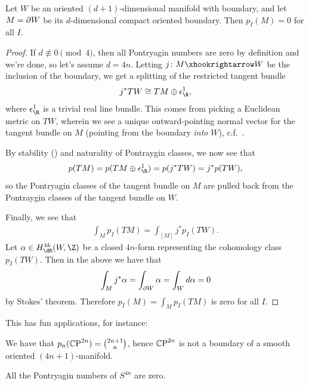 \documentclass[11pt]{book}
\begin{document}
\begin{lemma}\label{lem:pontryagin-numbers-of-boundary-are-zero} 
Let $W$ be an oriented $(d+1)$-dimensional manifold with boundary, and let $M = \partial W$ be its $d$-dimensional compact oriented boundary. Then $p_I(M) = 0$ for all $I$.
\end{lemma}
\begin{proof} If $d \not\equiv 0\pmod{4}$, then all Pontryagin numbers are zero by definition and we're done, so let's assume $d = 4n$. Letting $j \colon M \hookto W$ be the inclusion of the boundary, we get a splitting of the restricted tangent bundle
\begin{align*}
    j^\ast TW \cong TM \oplus \epsilon_\R^1,
\end{align*}
where $\epsilon_\R^1$ is a trivial real line bundle. This comes from picking a Euclidean metric on $TW$, wherein we see a unique outward-pointing normal vector for the tangent bundle on $M$ (pointing from the boundary \emph{into} $W$), c.f.~\cite[4.9]{MilnorStasheff}.

By stability () and naturality of Pontraygin classes, we now see that
\begin{align*}
    p(TM) = p(TM \oplus \epsilon_\R^1) = p(j^\ast TW) = j^\ast p(TW),
\end{align*}
so the Pontryagin classes of the tangent bundle on $M$ are pulled back from the Pontraygin classes of the tangent bundle on $W$.

Finally, we see that
\begin{align*}
    \int_M p_I(TM) = \int_{[M]} j^\ast p_I(TW).
\end{align*}
Let $\alpha \in H_{\dR}^{4k}(W,\Z)$ be a closed $4n$-form representing the cohomology class $p_I(TW)$. Then in the above we have that
\begin{align*}
    \int_M j^\ast \alpha = \int_{\partial W} \alpha = \int_W d\alpha = 0
\end{align*}
by Stokes' theorem. Therefore $p_I(M) = \int_M p_I(TM)$ is zero for all $I$.
\end{proof}

This has fun applications, for instance:

\begin{example} We have that $p_n({\mathbb{C}\text{P}}^{2n}) = \binom{2n+1}{n}$, hence ${\mathbb{C}\text{P}}^{2n}$ is not a boundary of a smooth oriented $(4n+1)$-manifold.
\end{example}

\begin{example} All the Pontryagin numbers of $S^{4n}$ are zero.
\end{example}
\end{document}
